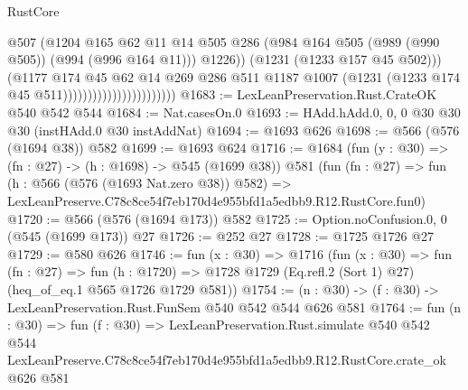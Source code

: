 \begin{lexlean}{RustCore}
\begin{coremodule}
                                                @507
                                                (@1204
                                                  @165
                                                  @62
                                                  @11
                                                  @14
                                                  @505
                                                  @286
                                                  (@984
                                                    @164
                                                    @505
                                                    (@989 (@990 @505))
                                                    (@994 (@996 @164 @11)))
                                                  @1226))
                                              (@1231 (@1233 @157 @45 @502)))
                                            (@1177
                                              @174
                                              @45
                                              @62
                                              @14
                                              @269
                                              @286
                                              @511
                                              @1187
                                              @1007
                                              (@1231 (@1233 @174 @45 @511)))))))))))))))))))))))
@1683 := LexLeanPreservation.Rust.CrateOK @540 @542 @544
@1684 := Nat.casesOn.{0}
@1693 := HAdd.hAdd.{0, 0, 0} @30 @30 @30 (instHAdd.{0} @30 instAddNat)
@1694 := @1693 @626
@1698 := @566 (@576 (@1694 @38)) @582
@1699 := @1693 @624
@1716 := @1684
    (fun (y : @30) => (fn : @27) -> (h : @1698) -> @545 (@1699 @38))
    @581
    (fun (fn : @27) =>
    fun (h : @566 (@576 (@1693 Nat.zero @38)) @582) =>
    LexLeanPreserve.C78c8ce54f7eb170d4e955bfd1a5edbb9.R12.RustCore.fun0)
@1720 := @566 (@576 (@1694 @173)) @582
@1725 := Option.noConfusion.{0, 0} (@545 (@1699 @173)) @27
@1726 := @252 @27
@1728 := @1725 @1726 @27
@1729 := @580 @626
@1746 := fun (x : @30) =>
  @1716
    (fun (x : @30) =>
    fun (fn : @27) =>
    fun (h : @1720) => @1728 @1729 (Eq.refl.{2} (Sort 1) @27) (heq_of_eq.{1} @565 @1726 @1729 @581))
@1754 := (n : @30) -> (f : @30) -> LexLeanPreservation.Rust.FunSem @540 @542 @544 @626 @581
@1764 := fun (n : @30) =>
  fun (f : @30) =>
  LexLeanPreservation.Rust.simulate
    @540
    @542
    @544
    LexLeanPreserve.C78c8ce54f7eb170d4e955bfd1a5edbb9.R12.RustCore.crate_ok
    @626
    @581
\end{coremodule}
\end{lexlean}
